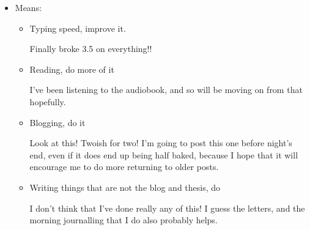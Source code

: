 \documentclass[12pt]{article}
\renewcommand{\,}{\textsuperscript{,}}
\begin{document}
\begin{itemize}
\begin{itemize}
\begin{itemize}
I wrote two letters yesterday! I posted one of them and forgot about the other.\footnote{sorry friend}

\item Handwriting, pick and make the new one

I still don't entirely know how I feel about lower case letters, but wow.

\end{itemize}

\item Means:

\begin{itemize}

\item Typing speed, improve it.

Finally broke 3.5 on everything!!

\item Reading, do more of it

I've been listening to the audiobook, and so will be moving on from that hopefully.

\item Blogging, do it

Look at this! Twoish for two! I'm going to post this one before night's end, even if it does end up being half baked, because I hope that it will encourage me to do more returning to older posts.

\item Writing things that are not the blog and thesis, do

I don't think that I've done really any of this!  
I guess the letters, and the morning journalling that I do also probably helps.

\end{itemize}

\end{itemize}

\end{itemize}
\end{document}
